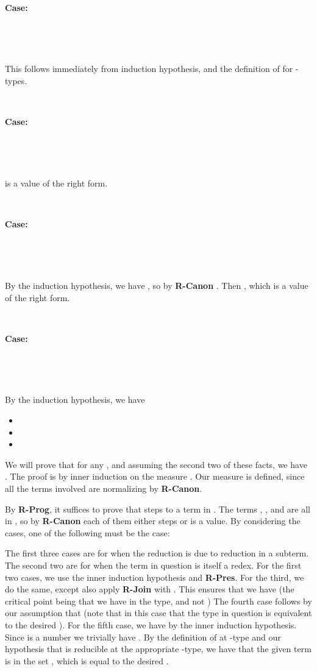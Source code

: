 \documentclass[copyright]{eptcs}
\begin{document}
\ 

\noindent \textbf{Case:}

\



\ 

\noindent This follows immediately from induction hypothesis, and the
definition of  for -types.

\ 

\noindent \textbf{Case:}

\



\

\noindent is a value of the right form.

\ 

\noindent \textbf{Case:}

\



\ 

\noindent By the induction hypothesis, we have , so by \textbf{R-Canon}  . Then , which is a value of the
right form.

\ 

\noindent \textbf{Case:}

\



\ 

\noindent By the induction hypothesis, we have
\begin{itemize}
\item 
\item 
\item 
\end{itemize}

\noindent We will prove that for any , and
assuming the second two of these facts, we have . The proof is
by inner induction on the measure .  Our measure is defined, since all the terms
involved are normalizing by \textbf{R-Canon}.

By \textbf{R-Prog}, it suffices to prove that  steps to a term in .  The
terms , , and  are all in  , 
so by \textbf{R-Canon} each of them either steps or is a value. By
considering the cases, one of the following must be the case:


\noindent The first three cases are for when the reduction is due to
reduction in a subterm.  The second two are for when the term in
question is itself a redex.  For the first two cases, we use the inner
induction hypothesis and \textbf{R-Pres}.  For the third, we do the
same, except also apply \textbf{R-Join} with .  This
ensures that we have  (the critical point being that we have 
in the type, and not ) The fourth case follows by our assumption
that  (note that in this case
that the type in question is equivalent to the desired ).
For the fifth case, we have  by the inner induction
hypothesis. Since  is a number we trivially have .  By the definition of  at -type
and our hypothesis that  is reducible at the appropriate
-type, we have that the given term is in the set , which is equal to the desired
.
\end{document}
